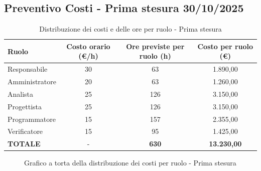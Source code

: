 \documentclass[a4paper, 11pt, oneside]{scrartcl} %
\begin{document}
\subsection{Preventivo Costi - Prima stesura 30/10/2025}
\begin{table}[!ht]
\centering
\renewcommand{\arraystretch}{1.4}
\begin{tabularx}{\textwidth}{L c c c}
\toprule
\textbf{Ruolo} & \textbf{Costo orario (€/h)} & \textbf{Ore previste per ruolo (h)} & \textbf{Costo per ruolo (€)} \\
\midrule
Responsabile & 30 & 63 & 1.890,00 \\
Amministratore & 20 & 63 & 1.260,00 \\
Analista & 25 & 126 & 3.150,00 \\
Progettista & 25 & 126 & 3.150,00 \\
Programmatore & 15 & 157 & 2.355,00 \\
Verificatore & 15 & 95 & 1.425,00 \\
\midrule
\textbf{TOTALE} & - & \textbf{630} & \textbf{13.230,00} \\
\bottomrule
\end{tabularx}
\caption{Distribuzione dei costi e delle ore per ruolo - Prima stesura}
\end{table}

\begin{figure}[!ht]
\centering
{}
\caption{Grafico a torta della distribuzione dei costi per ruolo - Prima stesura}
\end{figure}

\newpage
\end{document}
